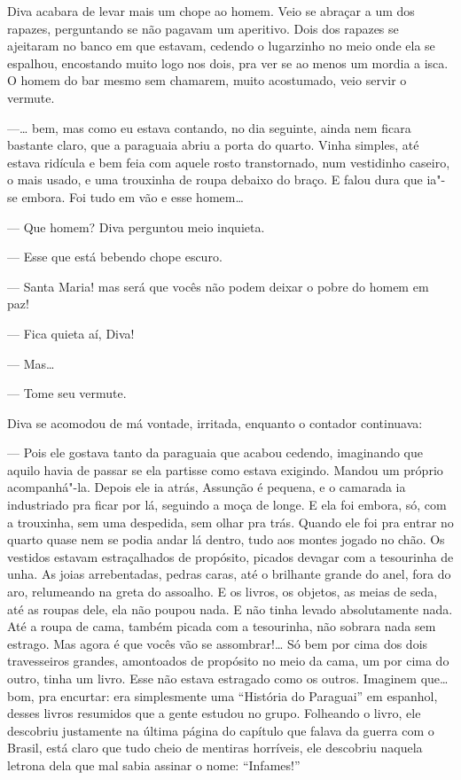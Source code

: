 Diva acabara de levar mais um chope ao homem. Veio se abraçar a um dos
rapazes, perguntando se não pagavam um aperitivo. Dois dos rapazes se
ajeitaram no banco em que estavam, cedendo o lugarzinho no meio onde ela
se espalhou, encostando muito logo nos dois, pra ver se ao menos um
mordia a isca. O homem do bar mesmo sem chamarem, muito acostumado, veio
servir o vermute.

---\ldots{} bem, mas como eu estava contando, no dia seguinte, ainda nem
ficara bastante claro, que a paraguaia abriu a porta do quarto. Vinha
simples, até estava ridícula e bem feia com aquele rosto transtornado,
num vestidinho caseiro, o mais usado, e uma trouxinha de roupa debaixo
do braço. E falou dura que ia"-se embora. Foi tudo em vão e esse homem\ldots{}

--- Que homem? Diva perguntou meio inquieta.

--- Esse que está bebendo chope escuro.

--- Santa Maria! mas será que vocês não podem deixar o pobre do homem em
paz!

--- Fica quieta aí, Diva!

--- Mas\ldots{}

--- Tome seu vermute.

Diva se acomodou de má vontade, irritada, enquanto o contador
continuava:

--- Pois ele gostava tanto da paraguaia que acabou cedendo, imaginando
que aquilo havia de passar se ela partisse como estava exigindo. Mandou
um próprio acompanhá"-la. Depois ele ia atrás, Assunção é pequena, e o
camarada ia industriado pra ficar por lá, seguindo a moça de longe. E
ela foi embora, só, com a trouxinha, sem uma despedida, sem olhar pra
trás. Quando ele foi pra entrar no quarto quase nem se podia andar lá
dentro, tudo aos montes jogado no chão. Os vestidos estavam
estraçalhados de propósito, picados devagar com a tesourinha de unha. As
joias arrebentadas, pedras caras, até o brilhante grande do anel, fora
do aro, relumeando na greta do assoalho. E os livros, os objetos, as
meias de seda, até as roupas dele, ela não poupou nada. E não tinha
levado absolutamente nada. Até a roupa de cama, também picada com a
tesourinha, não sobrara nada sem estrago. Mas agora é que vocês vão se
assombrar!\ldots{} Só bem por cima dos dois travesseiros grandes, amontoados
de propósito no meio da cama, um por cima do outro, tinha um livro. Esse
não estava estragado como os outros. Imaginem que\ldots{} bom, pra encurtar:
era simplesmente uma ``História do Paraguai'' em espanhol, desses livros
resumidos que a gente estudou no grupo. Folheando o livro, ele descobriu
justamente na última página do capítulo que falava da guerra com o
Brasil, está claro que tudo cheio de mentiras horríveis, ele descobriu
naquela letrona dela que mal sabia assinar o nome: ``Infames!''

